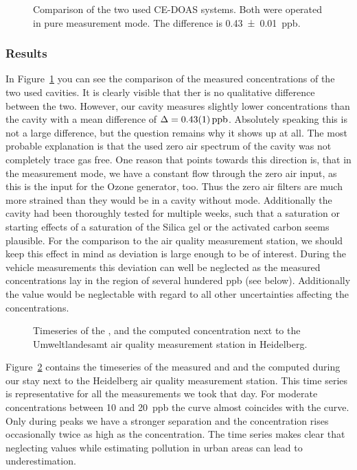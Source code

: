 \begin{figure}[htbp]
  \centering
  
  \caption{Comparison of the two used CE-DOAS systems. Both were
    operated in pure  measurement mode. The difference is
    \SI{0.43 \pm 0.01}{ppb}.}
  \label{fig:hd-comparison}
\end{figure}

\subsubsection{Results}
\label{sec:vehicle-results}

In Figure~\ref{fig:hd-comparison} you can see the comparison of the
measured  concentrations of the two used cavities. It is
clearly visible that ther is no qualitative difference between the
two. However, our  cavity measures slightly lower
concentrations than the  cavity with a mean difference of
$\Delta = \SI{0.43\pm0.01}{ppb}$. Absolutely speaking this is not a
large difference, but the question remains why it shows up at all. The
most probable explanation is that the used zero air spectrum of the
 cavity was not completely trace gas free. One reason that
points towards this direction is, that in the  measurement
mode, we have a constant flow through the zero air input, as this is
the input for the Ozone generator, too. Thus the zero air filters are much
more strained than they would be in a cavity without 
mode. Additionally the cavity had been thoroughly tested for multiple
weeks, such that a saturation or starting effects of a saturation of
the Silica gel or the activated carbon seems plausible. For the
comparison to the air quality measurement station, we should keep this
effect in mind as deviation is large enough to be of interest. During
the vehicle measurements this deviation can well be neglected as the
measured concentrations lay in the region of several hundered ppb (see
below). Additionally the value would be neglectable with regard to all
other uncertainties affecting the concentrations.

\begin{figure}[htbp]
  \centering
  
  \caption{Timeseries of the ,  and the computed
     concentration next to the Umweltlandesamt air quality
    measurement station in Heidelberg.}
  \label{fig:umba}
\end{figure}

Figure~\ref{fig:umba} contains the timeseries of the measured
 and  and the computed  during our stay next
to the Heidelberg air quality measurement station. This time series is
representative for all the measurements we took that day. For moderate
 concentrations between \num{10} and \SI{20}{ppb} the
 curve almost coincides with the  curve. Only during
peaks we have a stronger separation and the  concentration
rises occasionally twice as high as the  concentration. The
time series makes clear that neglecting  values while
estimating  pollution in urban areas can lead to
underestimation.

